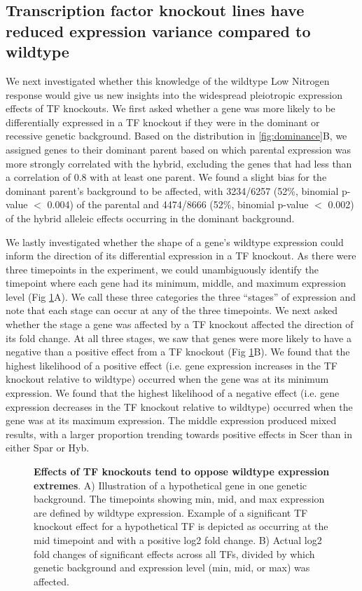 \subsection{Transcription factor knockout lines have reduced expression variance compared to wildtype}

We next investigated whether this knowledge of the wildtype Low Nitrogen response would give us new insights into the widespread pleiotropic expression effects of TF knockouts. We first asked whether a gene was more likely to be differentially expressed in a TF knockout if they were in the dominant or recessive genetic background. Based on the distribution in \ref{fig:dominance}B, we assigned genes to their dominant parent based on which parental expression was more strongly correlated with the hybrid, excluding the genes that had less than a correlation of 0.8 with at least one parent. We found a slight bias for the dominant parent's background to be affected, with 3234/6257 (52\%, binomial p-value $<$ 0.004) of the parental and 4474/8666 (52\%, binomial p-value $<$ 0.002) of the hybrid alleleic effects occurring in the dominant background.

We lastly investigated whether the shape of a gene's wildtype expression could inform the direction of its differential expression in a TF knockout. As there were three timepoints in the experiment, we could unambiguously identify the timepoint where each gene had its minimum, middle, and maximum expression level (Fig \ref{fig:variance}A). We call these three categories the three ``stages'' of expression and note that each stage can occur at any of the three timepoints. We next asked whether the stage a gene was affected by a TF knockout affected the direction of its fold change. At all three stages, we saw that genes were more likely to have a negative than a positive effect from a TF knockout (Fig \ref{fig:variance}B). We found that the highest likelihood of a positive effect (i.e. gene expression increases in the TF knockout relative to wildtype) occurred when the gene was at its minimum expression. We found that the highest likelihood of a negative effect (i.e. gene expression decreases in the TF knockout relative to wildtype) occurred when the gene was at its maximum expression. The middle expression produced mixed results, with a larger proportion trending towards positive effects in Scer than in either Spar or Hyb.

\begin{figure}
     \caption{\textbf{Effects of TF knockouts tend to oppose wildtype expression extremes}. A) Illustration of a hypothetical gene in one genetic background. The timepoints showing min, mid, and max expression are defined by wildtype expression. Example of a significant TF knockout effect for a hypothetical TF is depicted as occurring at the mid timepoint and with a positive log2 fold change. B) Actual log2 fold changes of significant effects across all TFs, divided by which genetic background and expression level (min, mid, or max) was affected.}
    \label{fig:variance}
\end{figure}

